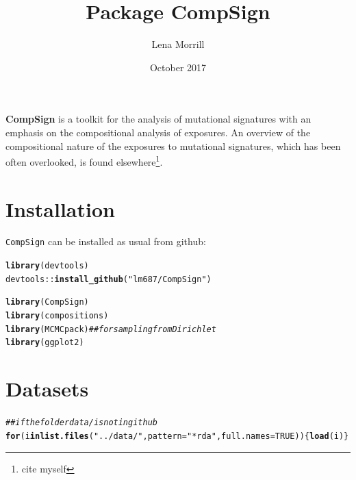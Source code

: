 \documentclass{article}\usepackage[]{graphicx}\usepackage[]{color}
\title{Package \textbf{CompSign}}
\author{Lena Morrill}
\date{October 2017}
\makeatletter
\newcommand{\hlnum}[1]{\textcolor[rgb]{0.686,0.059,0.569}{#1}}%
\newcommand{\hlstr}[1]{\textcolor[rgb]{0.192,0.494,0.8}{#1}}%
\newcommand{\hlcom}[1]{\textcolor[rgb]{0.678,0.584,0.686}{\textit{#1}}}%
\newcommand{\hlopt}[1]{\textcolor[rgb]{0,0,0}{#1}}%
\newcommand{\hlstd}[1]{\textcolor[rgb]{0.345,0.345,0.345}{#1}}%
\newcommand{\hlkwa}[1]{\textcolor[rgb]{0.161,0.373,0.58}{\textbf{#1}}}%
\newcommand{\hlkwc}[1]{\textcolor[rgb]{0.333,0.667,0.333}{#1}}%
\newcommand{\hlkwd}[1]{\textcolor[rgb]{0.737,0.353,0.396}{\textbf{#1}}}%
\newenvironment{kframe}{%
 \def\at@end@of@kframe{}%
 \ifinner\ifhmode%
  \def\at@end@of@kframe{\end{minipage}}%
  \begin{minipage}{\columnwidth}%
 \fi\fi%
 \def\FrameCommand##1{\hskip\@totalleftmargin \hskip-\fboxsep
 \colorbox{shadecolor}{##1}\hskip-\fboxsep
     \hskip-\linewidth \hskip-\@totalleftmargin \hskip\columnwidth}%
 \MakeFramed {\advance\hsize-\width
   \@totalleftmargin\z@ \linewidth\hsize
   \@setminipage}}%
 {\par\unskip\endMakeFramed%
 \at@end@of@kframe}
\newenvironment{knitrout}{}{} %
\makeatother
\begin{document}
\maketitle

\textbf{CompSign} is a toolkit for the analysis of mutational signatures with an emphasis on the compositional analysis of exposures. An overview of the compositional nature of the exposures to mutational signatures, which has been often overlooked, is found elsewhere\footnote{cite myself}.





\section{Installation}
\texttt{CompSign} can be installed as usual from github:

\begin{knitrout}
\color{fgcolor}\begin{kframe}
\begin{alltt}
\hlkwd{library}\hlstd{(devtools)}
\hlstd{devtools}\hlopt{::}\hlkwd{install_github}\hlstd{(}\hlstr{"lm687/CompSign"}\hlstd{)}
\end{alltt}
\end{kframe}
\end{knitrout}

\begin{knitrout}
\color{fgcolor}\begin{kframe}
\begin{alltt}
\hlkwd{library}\hlstd{(CompSign)}
\hlkwd{library}\hlstd{(compositions)}
\hlkwd{library}\hlstd{(MCMCpack)}      \hlcom{## for sampling from Dirichlet}
\hlkwd{library}\hlstd{(ggplot2)}
\end{alltt}
\end{kframe}
\end{knitrout}

\clearpage
\section{Datasets}
\begin{knitrout}
\color{fgcolor}\begin{kframe}
\begin{alltt}
\hlcom{## if the folder data/ is not in github}
\hlkwa{for}\hlstd{(i} \hlkwa{in} \hlkwd{list.files}\hlstd{(}\hlstr{"../data/"}\hlstd{,} \hlkwc{pattern} \hlstd{=} \hlstr{"*rda"}\hlstd{,} \hlkwc{full.names} \hlstd{=} \hlnum{TRUE}\hlstd{))\{}\hlkwd{load}\hlstd{(i)\}}
\end{alltt}
\end{kframe}
\end{knitrout}
\end{document}
